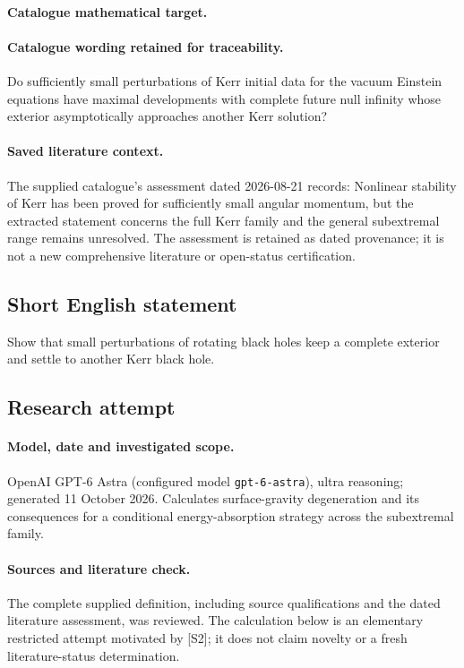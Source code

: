 \documentclass[11pt]{article}
\begin{document}
\paragraph{Catalogue mathematical target.}
\paragraph{Catalogue wording retained for traceability.}
Do sufficiently small perturbations of Kerr initial data for the vacuum Einstein equations have maximal developments with complete future null infinity whose exterior asymptotically approaches another Kerr solution?

\paragraph{Saved literature context.} The supplied catalogue's assessment dated 2026-08-21 records: Nonlinear stability of Kerr has been proved for sufficiently small angular momentum, but the extracted statement concerns the full Kerr family and the general subextremal range remains unresolved. The assessment is retained as dated provenance; it is not a new comprehensive literature or open-status certification.
\subsection{Short English statement}
Show that small perturbations of rotating black holes keep a complete exterior and settle to another Kerr black hole.
\subsection{Research attempt}
\paragraph{Model, date and investigated scope.}
OpenAI GPT-6 Astra (configured model \texttt{gpt-6-astra}), ultra reasoning; generated 11 October 2026. Calculates surface-gravity degeneration and its consequences for a conditional energy-absorption strategy across the subextremal family.

\paragraph{Sources and literature check.}
The complete supplied definition, including source qualifications and the dated literature assessment, was reviewed. The calculation below is an elementary restricted attempt motivated by [S2]; it does not claim novelty or a fresh literature-status determination.
\end{document}
